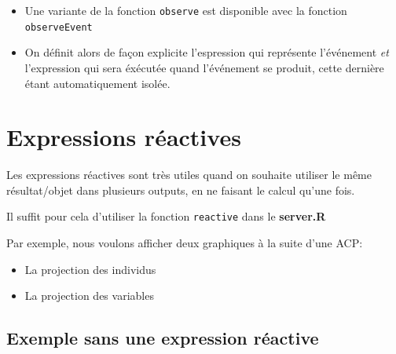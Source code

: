 \documentclass[
]{article}
\newenvironment{Shaded}{\begin{snugshade}}{\end{snugshade}}
\newcommand{\AttributeTok}[1]{\textcolor[rgb]{0.13,0.29,0.53}{#1}}
\newcommand{\CommentTok}[1]{\textcolor[rgb]{0.56,0.35,0.01}{\textit{#1}}}
\newcommand{\FunctionTok}[1]{\textcolor[rgb]{0.13,0.29,0.53}{\textbf{#1}}}
\newcommand{\NormalTok}[1]{#1}
\newcommand{\SpecialCharTok}[1]{\textcolor[rgb]{0.81,0.36,0.00}{\textbf{#1}}}
\newcommand{\StringTok}[1]{\textcolor[rgb]{0.31,0.60,0.02}{#1}}
\providecommand{\tightlist}{%
  \setlength{\itemsep}{0pt}\setlength{\parskip}{0pt}}
\begin{document}
\begin{itemize}
\tightlist
\item
  Une variante de la fonction \texttt{observe} est disponible avec la
  fonction \texttt{observeEvent}
\item
  On définit alors de façon explicite l'espression qui représente
  l'événement \emph{et} l'expression qui sera éxécutée quand l'événement
  se produit, cette dernière étant automatiquement isolée.
\end{itemize}

\begin{Shaded}
\end{Shaded}

\hypertarget{expressions-ruxe9actives}{%
\section{Expressions réactives}\label{expressions-ruxe9actives}}

Les expressions réactives sont très utiles quand on souhaite utiliser le
même résultat/objet dans plusieurs outputs, en ne faisant le calcul
qu'une fois.

Il suffit pour cela d'utiliser la fonction \texttt{reactive} dans le
\textbf{server.R}

Par exemple, nous voulons afficher deux graphiques à la suite d'une ACP:

\begin{itemize}
\tightlist
\item
  La projection des individus
\item
  La projection des variables
\end{itemize}

\hypertarget{exemple-sans-une-expression-ruxe9active}{%
\subsection{Exemple sans une expression
réactive}\label{exemple-sans-une-expression-ruxe9active}}
\end{document}

